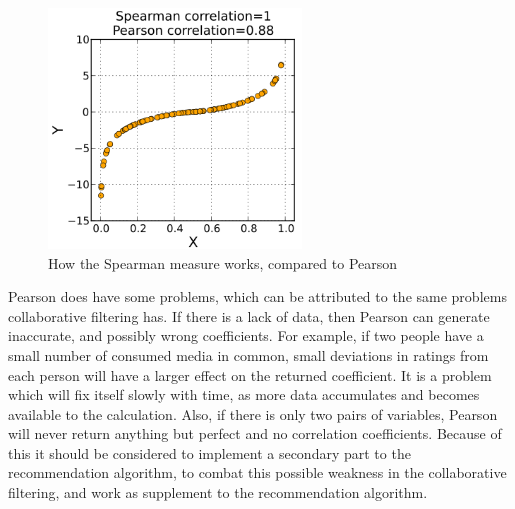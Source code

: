 \begin{figure}[htb]
\centering
\includegraphics[width=0.6\textwidth]{Images/spearman.png}
\caption{How the Spearman measure works, compared to Pearson \cite{Spearman2}}
\label{Spearman}
\end{figure}

Pearson does have some problems, which can be attributed to the same problems collaborative filtering has. If there is a lack of data, then Pearson can generate inaccurate, and possibly wrong coefficients. For example, if two people have a small number of consumed media in common, small deviations in ratings from each person will have a larger effect on the returned coefficient. It is a problem which will fix itself slowly with time, as more data accumulates and becomes available to the calculation. Also, if there is only two pairs of variables, Pearson will never return anything but perfect and no correlation coefficients. Because of this it should be considered to implement a secondary part to the recommendation algorithm, to combat this possible weakness in the collaborative filtering, and work as supplement to the recommendation algorithm.


